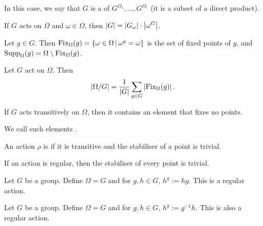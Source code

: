 \begin{remark}
  In this case, we say that $G$ is a  of $G^{\Omega_1},
  \ldots, G^{\Omega_r}$ (it is a subset of a direct product).
\end{remark}

\begin{lemma}
  If $G$ acts on $\Omega$ and $\omega \in \Omega$, then $\left| G \right| =
  \left| G_\omega \right| \cdot \left| \omega^G \right|$.
\end{lemma}

\begin{definition}
  Let $g \in G$.
  Then $\operatorname{Fix}_\Omega(g) = \{ \omega \in \Omega \,|\, \omega^g = \omega \}$ is the
  set of fixed points of $g$, and $\operatorname{Supp}_\Omega(g) = \Omega \setminus
  \operatorname{Fix}_\Omega(g)$.
\end{definition}

\begin{lemma}
  Let $G$ act on $\Omega$.
  Then
  \[
	\left| \Omega / G \right| = \frac{1}{\left| G \right|} \sum_{g \in G} \left| \operatorname{Fix}_\Omega(g) \right|.
  \]
\end{lemma}

\begin{corollary}
  If $G$ acts transitively on $\Omega$, then it contains an element that fixes
  no points.
\end{corollary}

\begin{remark}
  We call such elements .
\end{remark}

\begin{definition}
  An action $\rho$ is  if it is transitive and the stabiliser of
  a point is trivial.
\end{definition}

\begin{remark}
  If an action is regular, then the stabiliser of every point is trivial.
\end{remark}

\begin{example}
  Let $G$ be a group.
  Define $\Omega = G$ and for $g, h \in G$, $h^g := h g$.
  This is a regular action.
\end{example}

\begin{example}
  Let $G$ be a group.
  Define $\Omega = G$ and for $g, h \in G$, $h^g := g^{-1} h$.
  This is also a regular action.
\end{example}


